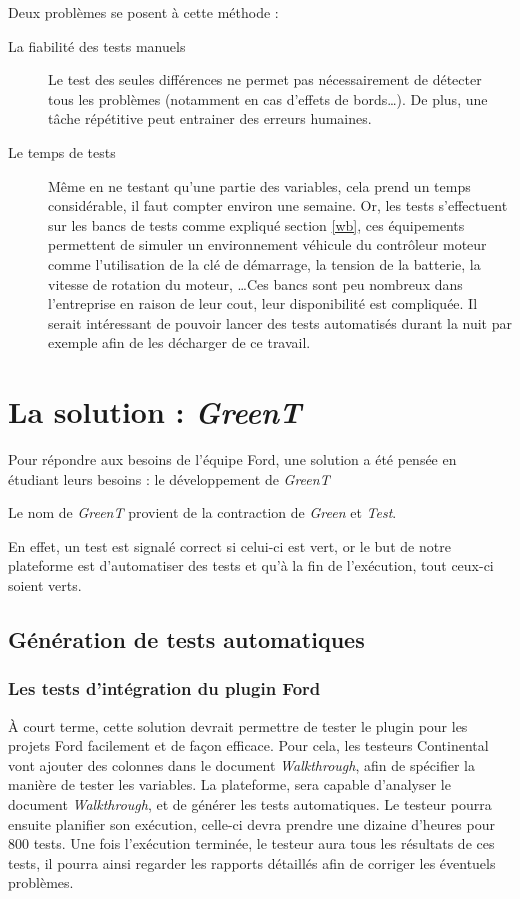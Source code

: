 	\vspace{20px}
	Deux problèmes se posent à cette méthode : 
	\begin{description}
		\item[La fiabilité des tests manuels] Le test des seules différences ne permet pas nécessairement de détecter tous les problèmes (notamment en cas d'effets de bords\ldots). De plus, une tâche répétitive peut entrainer des erreurs humaines.
		\item[Le temps de tests] Même en ne testant qu'une partie des variables, cela prend un temps considérable, il faut compter environ une semaine.\newline
			Or, les tests s'effectuent sur les bancs de tests comme expliqué section \ref{wb}, ces équipements permettent de simuler un environnement véhicule du contrôleur moteur comme
			l'utilisation de la clé de démarrage, la tension de la batterie, la vitesse de rotation du moteur, \ldots Ces bancs sont peu
			nombreux dans l'entreprise en raison de leur cout, leur disponibilité est compliquée. Il serait intéressant de pouvoir lancer
			des tests automatisés durant la nuit par exemple afin de les décharger de ce travail.
	\end{description}
	
\newpage
	\section{La solution : \textit{GreenT}}
	Pour répondre aux besoins de l'équipe Ford, une solution a été pensée en étudiant leurs besoins : le développement de \textit{GreenT}
	\begin{remarque}
		Le nom de \textit{GreenT} provient de la contraction de \textit{Green} et \textit{Test}.
		
		En effet, un test est signalé correct si celui-ci est vert, or le but de notre plateforme est d'automatiser des tests et qu'à la fin de l'exécution, tout ceux-ci soient verts.
	\end{remarque}
	
	\subsection{Génération de tests automatiques}
	\subsubsection{Les tests d'intégration du plugin Ford}
	À court terme, cette solution devrait permettre de tester le plugin pour les projets Ford facilement et de façon efficace. Pour cela, les testeurs Continental vont ajouter des colonnes dans le document \textit{Walkthrough}, afin de spécifier la manière de tester les variables. La plateforme, sera capable d'analyser le document \textit{Walkthrough}, et de générer les tests automatiques. Le testeur pourra ensuite planifier son exécution, celle-ci devra prendre une dizaine d'heures pour 800 tests. Une fois l'exécution terminée, le testeur aura tous les résultats de ces tests, il pourra ainsi regarder les rapports détaillés afin de corriger les éventuels problèmes.
	
